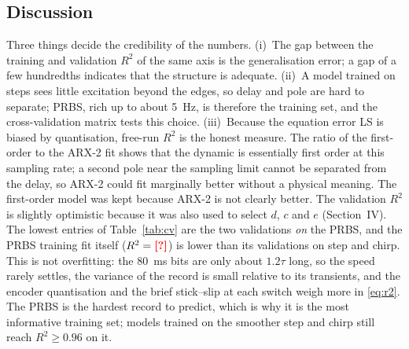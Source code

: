 \documentclass[conference]{IEEEtran}\newcommand{\haveieee}{}%
\newcommand{\todo}[1]{{\color{red}\textbf{[#1]}}}
\newcommand{\fallbackmacros}{\todo{?}}
\providecommand{\RtwoLonTrain}{\fallbackmacros}\providecommand{\RtwoLonValStep}{\fallbackmacros}
\begin{document}
\subsection{Discussion}
Three things decide the credibility of the numbers. (i)~The gap between the training and validation $R^2$ of the same axis is the generalisation error; a gap of a few hundredths indicates that the structure is adequate. (ii)~A model trained on steps sees little excitation beyond the edges, so delay and pole are hard to separate; PRBS, rich up to about 5~Hz, is therefore the training set, and the cross-validation matrix tests this choice. (iii)~Because the equation error LS is biased by quantisation, free-run $R^2$ is the honest measure. The ratio of the first-order to the ARX-2 fit shows that the dynamic is essentially first order at this sampling rate; a second pole near the sampling limit cannot be separated from the delay, so ARX-2 could fit marginally better without a physical meaning. The first-order model was kept because ARX-2 is not clearly better. The validation $R^2$ is slightly optimistic because it was also used to select $d$, $c$ and $e$ (Section~IV). The lowest entries of Table~\ref{tab:cv} are the two validations \emph{on} the PRBS, and the PRBS training fit itself ($R^2=\RtwoLonTrain$) is lower than its validations on step and chirp. This is not overfitting: the 80~ms bits are only about $1.2\tau$ long, so the speed rarely settles, the variance of the record is small relative to its transients, and the encoder quantisation and the brief stick--slip at each switch weigh more in \eqref{eq:r2}. The PRBS is the hardest record to predict, which is why it is the most informative training set; models trained on the smoother step and chirp still reach $R^2\ge0.96$ on it.
\end{document}
